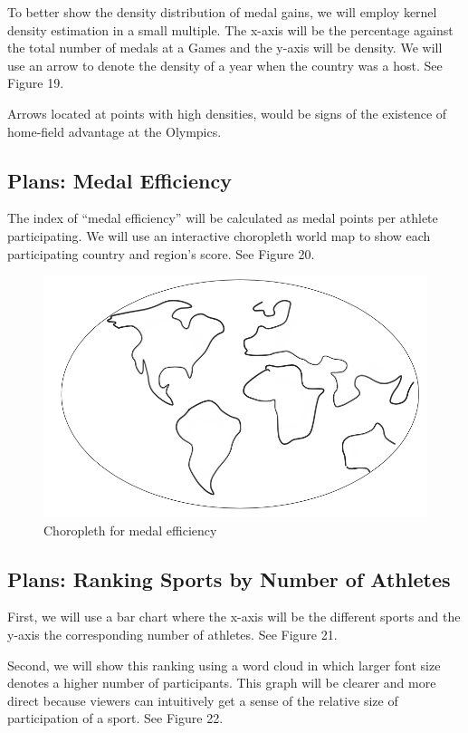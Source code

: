\documentclass[12pt]{article}
\begin{document}
To better show the density distribution of medal gains, we will employ kernel density estimation in a small multiple. The x-axis will be the percentage against the total number of medals at a Games and the y-axis will be density. We will use an arrow to denote the density of a year when the country was a host. See Figure 19.

Arrows located at points with high densities, would be signs of the existence of home-field advantage at the Olympics. 

\subsection{Plans: Medal Efficiency}
The index of “medal efficiency” will be calculated as medal points per athlete participating. We will use an interactive choropleth world map to show each participating country and region’s score. See Figure 20.

\begin{figure}[!b]
    \centering
    \includegraphics[scale=0.5]{pics/9.png}
    \caption{Choropleth for medal efficiency}
    \label{fig:my_label}
\end{figure}

\subsection{Plans: Ranking Sports by Number of Athletes}
First, we will use a bar chart where the x-axis will be the different sports and the y-axis the corresponding number of athletes. See Figure 21. 


Second, we will show this ranking using a word cloud in which larger font size denotes a higher number of participants. This graph will be clearer and more direct because viewers can intuitively get a sense of the relative size of participation of a sport. See Figure 22.
\end{document}
